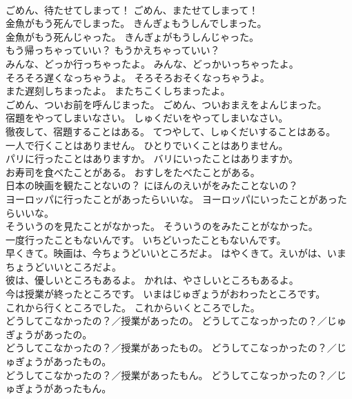 \documentclass[8pt]{extreport}
\begin{document}
\begin{CJK}{UTF8}{min}
\\	ごめん、待たせてしまって！	ごめん、またせてしまって！ 
\\	金魚がもう死んでしまった。	きんぎょもうしんでしまった。 
\\	金魚がもう死んじゃった。	きんぎょがもうしんじゃった。 
\\	もう帰っちゃっていい？	もうかえちゃっていい？ 
\\	みんな、どっか行っちゃったよ。	みんな、どっかいっちゃったよ。 
\\	そろそろ遅くなっちゃうよ。	そろそろおそくなっちゃうよ。 
\\	また遅刻しちまったよ。	またちこくしちまったよ。 
\\	ごめん、ついお前を呼んじまった。	ごめん、ついおまえをよんじまった。 
\\	宿題をやってしまいなさい。	しゅくだいをやってしまいなさい。 
\\	徹夜して、宿題することはある。	てつやして、しゅくだいすることはある。 
\\	一人で行くことはありません。	ひとりでいくことはありません。 
\\	パリに行ったことはありますか。	バリにいったことはありますか。 
\\	お寿司を食べたことがある。	おすしをたべたことがある。 
\\	日本の映画を観たことないの？	にほんのえいがをみたことないの？ 
\\	ヨーロッパに行ったことがあったらいいな。	ヨーロッパにいったことがあったらいいな。 
\\	そういうのを見たことがなかった。	そういうのをみたことがなかった。 
\\	一度行ったこともないんです。	いちどいったこともないんです。 
\\	早くきて。映画は、今ちょうどいいところだよ。	はやくきて。えいがは、いまちょうどいいところだよ。 
\\	彼は、優しいところもあるよ。	かれは、やさしいところもあるよ。 
\\	今は授業が終ったところです。	いまはじゅぎょうがおわったところです。 
\\	これから行くところでした。	これからいくところでした。 
\\	どうしてこなかったの？／授業があったの。	どうしてこなっかったの？／じゅぎょうがあったの。 
\\	どうしてこなかったの？／授業があったもの。	どうしてこなっかったの？／じゅぎょうがあったもの。 
\\	どうしてこなかったの？／授業があったもん。	どうしてこなっかったの？／じゅぎょうがあったもん。 

\end{CJK}
\end{document}

